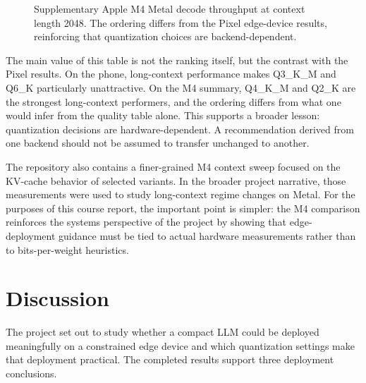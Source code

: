 \documentclass{article}
\begin{document}
\begin{figure}[t]
\centering
{}
\caption{Supplementary Apple M4 Metal decode throughput at context length 2048. The ordering differs from the Pixel edge-device results, reinforcing that quantization choices are backend-dependent.}
\label{fig:m4_tps}
\end{figure}

The main value of this table is not the ranking itself, but the contrast with the Pixel results. On the phone, long-context performance makes Q3\_K\_M and Q6\_K particularly unattractive. On the M4 summary, Q4\_K\_M and Q2\_K are the strongest long-context performers, and the ordering differs from what one would infer from the quality table alone. This supports a broader lesson: quantization decisions are hardware-dependent. A recommendation derived from one backend should not be assumed to transfer unchanged to another.

The repository also contains a finer-grained M4 context sweep focused on the KV-cache behavior of selected variants. In the broader project narrative, those measurements were used to study long-context regime changes on Metal. For the purposes of this course report, the important point is simpler: the M4 comparison reinforces the systems perspective of the project by showing that edge-deployment guidance must be tied to actual hardware measurements rather than to bits-per-weight heuristics.

\section{Discussion}
\label{sec:discussion}

The project set out to study whether a compact LLM could be deployed meaningfully on a constrained edge device and which quantization settings make that deployment practical. The completed results support three deployment conclusions.
\end{document}
